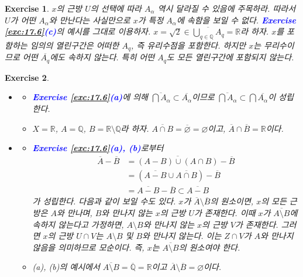 \documentclass{article}
\newtheorem{exercise}{Exercise}[section]
\newcommand{\Q}{\mathbb{Q}}
\newcommand{\R}{\mathbb{R}}
\begin{document}
\begin{exercise}
    $x$의 근방 $U$의 선택에 따라 $A_\alpha$ 역시 달라질 수 있음에 주목하라. 따라서 $U$가 어떤 $A_\alpha$와 만난다는 사실만으로 $x$가 특정 $A_\alpha$에 속함을 보일 수 없다. \textcolor{blue}{\textbf{Exercise \ref{exc:17.6}(c)}}의 예시를 그대로 이용하자. $x=\sqrt2\in\overline{\bigcup_{q\in\Q}A_q}=\R$라 하자. $x$를 포함하는 임의의 열린구간은 어떠한 $A_q$, 즉 유리수점을 포함한다. 하지만 $x$는 무리수이므로 어떤 $\overline{A_q}$에도 속하지 않는다. 특히 어떤 $A_q$도 모든 열린구간에 포함되지 않는다.
\end{exercise}

\begin{exercise}
    \phantom{}
    \begin{itemize}
        \item[(a), (b)] \begin{itemize}
            \item[($\subset$)] \textcolor{blue}{\textbf{Exercise \ref{exc:17.6}(a)}}에 의해 $\overline{\bigcap A_\alpha}\subset\overline{A_\alpha}$이므로 $\overline{\bigcap A_\alpha}\subset\bigcap\overline{A_\alpha}$이 성립한다.
            \item[($\not\supset$)] $X=\R$, $A=\Q$, $B=\R\setminus\Q$라 하자. $\overline{A\cap B}=\overline{\varnothing}=\varnothing$이고, $\overline{A}\cap\overline{B}=\R$이다.
        \end{itemize}
        \item[(c)] \begin{itemize}
            \item[($\supset$)] \textcolor{blue}{\textbf{Exercise \ref{exc:17.6}(a), (b)}}로부터
                \begin{align*}
                    \overline{A}-\overline{B}&=\overline{(A-B)\cup(A\cap B)}-\overline{B}\\
                    &=(\overline{A-B}\cup\overline{A\cap B})-\overline{B}\\
                    &=\overline{A-B}-\overline{B}\subset\overline{A-B}
                \end{align*}
                가 성립한다. 다음과 같이 보일 수도 있다. $x$가 $\overline{A}\setminus\overline{B}$의 원소이면, $x$의 모든 근방은 $A$와 만나며, $B$와 만나지 않는 $x$의 근방 $U$가 존재한다. 이때 $x$가 $\overline{A\setminus B}$에 속하지 않는다고 가정하면, $A\setminus B$와 만나지 않는 $x$의 근방 $V$가 존재한다. 그러면 $x$의 근방 $U\cap V$는 $A\setminus B$ 및 $B$와 만나지 않는다. 이는 $Z\cap V$가 $A$와 만나지 않음을 의미하므로 모순이다. 즉, $x$는 $\overline{A\setminus B}$의 원소여야 한다.
            \item[($\not\subset$)] (a), (b)의 예시에서 $\overline{A\setminus B}=\overline{\Q}=\R$이고 $\overline{A}\setminus\overline{B}=\varnothing$이다.
        \end{itemize}
    \end{itemize}
\end{exercise}
\end{document}
